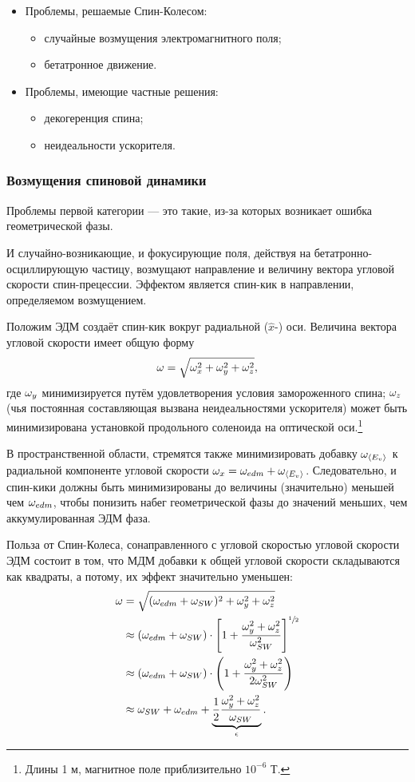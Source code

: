 \begin{itemize}
	\item Проблемы, решаемые Спин-Колесом:
	\begin{itemize}
		\item случайные возмущения электромагнитного поля;
		\item бетатронное движение.
	\end{itemize}
	\item Проблемы, имеющие частные решения:
	\begin{itemize}
		\item декогеренция спина;
		\item неидеальности ускорителя.
	\end{itemize}
\end{itemize}

\subsubsection{Возмущения спиновой динамики}
Проблемы первой категории --- это такие, из-за которых возникает ошибка геометрической фазы.

И случайно-возникающие, и фокусирующие поля, действуя на бетатронно-осциллирующую частицу,
возмущают направление и величину вектора угловой скорости спин-прецессии. Эффектом является
спин-кик в направлении, определяемом возмущением.

Положим ЭДМ создаёт спин-кик вокруг радиальной ($\hat x$-) оси. Величина вектора угловой скорости
имеет общую форму
\[
\omega = \sqrt{\omega_x^2 + \omega_y^2 + \omega_z^2},
\]
где  $\omega_y$ минимизируется путём удовлетворения условия замороженного спина; $\omega_z$ (чья постоянная
составляющая вызвана неидеальностями ускорителя) может быть минимизирована установкой продольного 
соленоида на оптической оси.\footnote{Длины 1 м, магнитное поле приблизительно $10^{-6}$ Т.}

В пространственной области, стремятся также минимизировать добавку $\wimp$ к радиальной компоненте
угловой скорости $\w_x = \w_{edm} + \wimp$. Следовательно, и спин-кики должны быть минимизированы до
величины (значительно) меньшей чем $\omega_{edm}$, чтобы понизить набег геометрической фазы до значений
меньших, чем аккумулированная ЭДМ фаза.

Польза от Спин-Колеса, сонаправленного с угловой скоростью угловой скорости ЭДМ состоит в том, что
МДМ добавки к общей угловой скорости складываются как квадраты, а потому, их эффект значительно уменьшен:
\begin{align*}
	\w &= \sqrt{(\wedm + \wsw)^2 + \w_y^2 + \w_z^2} \\
	&\approx (\wedm+\wsw)\cdot\bkt*{1 + \frac{\w_y^2 + \w_z^2}{\wsw^2}}^{\sfrac12} \\
	&\approx (\wedm + \wsw)\cdot \bkt{1 + \frac{\w_y^2 + \w_z^2}{2\wsw^2}} \\
	&\approx \wsw + \wedm + \underbrace{\frac12\frac{\w_y^2 + \w_z^2}{\wsw}}_{\epsilon}.
\end{align*}

